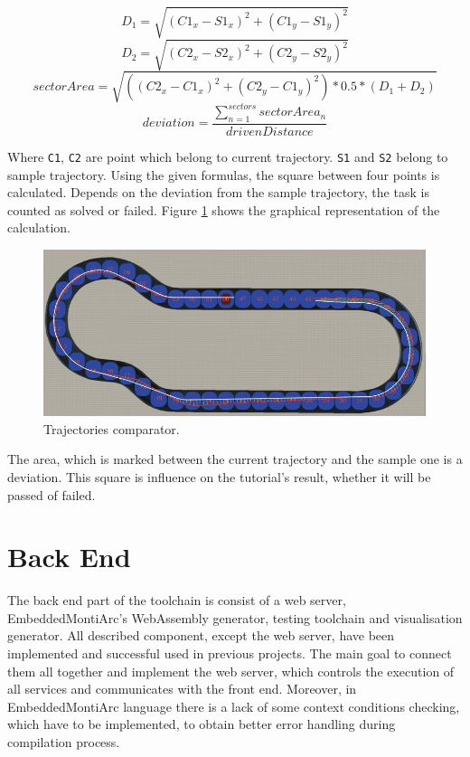 \begin{equation} \label{eq:eq1}
    D_1 = \sqrt{(C1_x - S1_x)^2 + (C1_y - S1_y)^2}
\end{equation}
\begin{equation} \label{eq:eq2}
    D_2 = \sqrt{(C2_x - S2_x)^2 + (C2_y - S2_y)^2}
\end{equation}
\begin{equation} \label{eq:eq3}
    sectorArea = \sqrt{((C2_x - C1_x)^2 + (C2_y - C1_y)^2) * 0.5 * (D_1 + D_2)}
\end{equation}
\begin{equation} \label{eq:eq4}
    deviation = \frac{\sum_{n=1}^{sectors} sectorArea_n}{drivenDistance}
\end{equation}

Where \texttt{C1}, \texttt{C2} are point which belong to current trajectory. \texttt{S1} and \texttt{S2} belong to sample trajectory. Using the given formulas, the square between four points is calculated. Depends on the deviation from the sample trajectory, the task is counted as solved or failed. Figure \ref{fig:trajectory-comparator} shows the graphical representation of the calculation. \newpage
\begin{figure}[ht!]
    \centering
    \includegraphics[width=\linewidth]{src/pic/trajectory-comparison}
    \caption{Trajectories comparator.}
    \label{fig:trajectory-comparator}
\end{figure}
The area, which is marked between the current trajectory and the sample one is a deviation. This square is influence on the tutorial's result, whether it will be passed of failed.

\section{Back End}
The back end part of the toolchain is consist of a web server, EmbeddedMontiArc's WebAssembly generator, testing toolchain and visualisation generator. All described component, except the web server, have been implemented and successful used in previous projects. The main goal to connect them all together and implement the web server, which controls the execution of all services and communicates with the front end. Moreover, in EmbeddedMontiArc language there is a lack of some context conditions checking, which have to be implemented, to obtain better error handling during compilation process.

